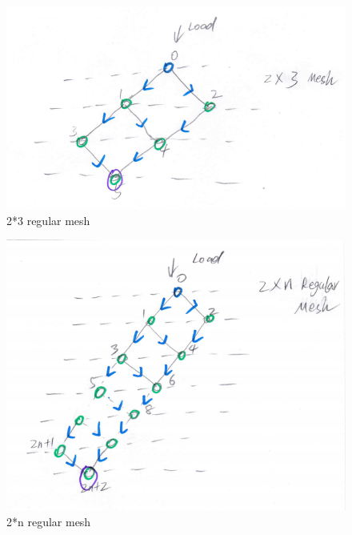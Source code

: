 \documentclass[preprint,12pt]{elsarticle}
\begin{document}
\begin{figure}[h]
\centering\includegraphics[width=1\linewidth]{unitmesh2}
\caption{2*3 regular mesh}
\label{unitmesh2}
\end{figure}

\begin{figure}[h]
\centering\includegraphics[width=1\linewidth]{unitmesh3}
\caption{2*n regular mesh}
\label{unitmesh3}
\end{figure}
\end{document}
